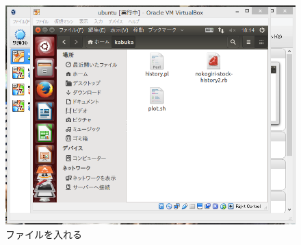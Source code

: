 \begin{figure}[htb]
\centering
\includegraphics[width=15cm]{file.PNG}
\caption{ファイルを入れる}\label{サンプル図}
\end{figure}
